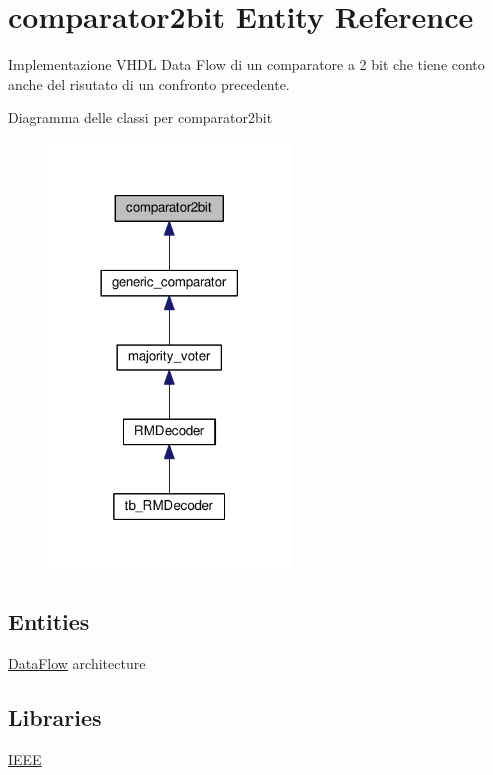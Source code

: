 \hypertarget{classcomparator2bit}{\section{comparator2bit Entity Reference}
\label{classcomparator2bit}
}


Implementazione V\+H\+D\+L Data Flow di un comparatore a 2 bit che tiene conto anche del risutato di un confronto precedente.  




Diagramma delle classi per comparator2bit\nopagebreak
\begin{figure}[H]
\begin{center}
\leavevmode
\includegraphics[width=182pt]{classcomparator2bit__inherit__graph}
\end{center}
\end{figure}
\subsection*{Entities}
\begin{DoxyCompactItemize}
\item 
\hyperlink{classcomparator2bit_1_1_data_flow}{Data\+Flow} architecture
\end{DoxyCompactItemize}
\subsection*{Libraries}
 \begin{DoxyCompactItemize}
\item 
\hypertarget{classcomparator2bit_gae4f03c286607f3181e16b9aa12d0c6d4}{\hyperlink{group___majority_voter_gae4f03c286607f3181e16b9aa12d0c6d4}{I\+E\+E\+E} }\label{classcomparator2bit_gae4f03c286607f3181e16b9aa12d0c6d4}

\end{DoxyCompactItemize}
